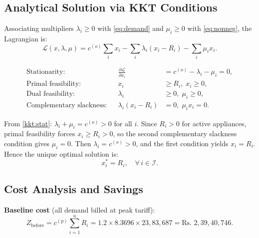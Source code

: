 \documentclass[12pt,a4paper]{article}
\begin{document}
\subsection{Analytical Solution via KKT Conditions}

Associating multipliers $\lambda_i \geq 0$ with \eqref{eq:demand} and
$\mu_i \geq 0$ with \eqref{eq:nonneg}, the Lagrangian is:
\begin{equation}
  \mathcal{L}(x, \lambda, \mu)
  = c^{(o)}\sum_i x_i - \sum_i \lambda_i(x_i - R_i) - \sum_i \mu_i x_i.
\end{equation}

\begin{tcolorbox}[colback=blue!5!white, colframe=isidark, title=KKT Conditions]
\begin{align}
  \text{Stationarity:}           && \frac{\partial \mathcal{L}}{\partial x_i}
                                    &= c^{(o)} - \lambda_i - \mu_i = 0, \label{kkt:stat}\\
  \text{Primal feasibility:}     && x_i &\geq R_i,\; x_i \geq 0, \\
  \text{Dual feasibility:}       && \lambda_i &\geq 0,\; \mu_i \geq 0, \\
  \text{Complementary slackness:}&& \lambda_i(x_i - R_i) &= 0,\; \mu_i x_i = 0.
  \label{kkt:cs}
\end{align}
\end{tcolorbox}

From \eqref{kkt:stat}: $\lambda_i + \mu_i = c^{(o)} > 0$ for all $i$. Since
$R_i > 0$ for active appliances, primal feasibility forces $x_i \geq R_i > 0$,
so the second complementary slackness condition gives $\mu_i = 0$. Then
$\lambda_i = c^{(o)} > 0$, and the first condition yields $x_i = R_i$. Hence the
unique optimal solution is:
\begin{equation}
  x^*_i = R_i, \quad \forall\, i \in \mathcal{I}.
  \label{eq:opt}
\end{equation}

\subsection{Cost Analysis and Savings}

\textbf{Baseline cost} (all demand billed at peak tariff):
\begin{equation}
  Z_{\text{before}} = c^{(p)}\sum_{i=1}^{n} R_i
  = 1.2 \times 8.3696 \times 23{,}83{,}687
  = \text{Rs.~} 2{,}39{,}40{,}746.
  \label{eq:zbefore}
\end{equation}
\end{document}
